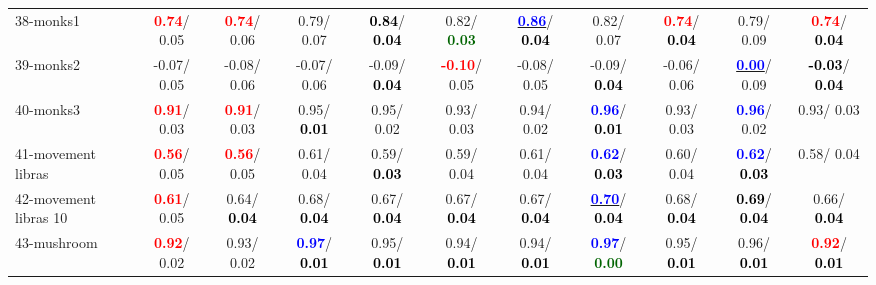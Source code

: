 \begin{table}[h]
\begin{center}
{\begin{tabular}{lc|c|c|c|c|c|c|c|c|c}
38-monks1 & \textcolor{red}{\textbf{  0.74}}/  0.05 & \textcolor{red}{\textbf{  0.74}}/  0.06 &   0.79/  0.07 & \textcolor{black}{\textbf{  0.84}}/\textcolor{black}{\textbf{  0.04}} &   0.82/\textcolor{darkgreen}{\textbf{  0.03}} & \underline{\textcolor{blue}{\textbf{  0.86}}}/\textcolor{black}{\textbf{  0.04}} &   0.82/  0.07 & \textcolor{red}{\textbf{  0.74}}/\textcolor{black}{\textbf{  0.04}} &   0.79/  0.09 & \textcolor{red}{\textbf{  0.74}}/\textcolor{black}{\textbf{  0.04}} \\
39-monks2 &  -0.07/  0.05 &  -0.08/  0.06 &  -0.07/  0.06 &  -0.09/\textcolor{black}{\textbf{  0.04}} & \textcolor{red}{\textbf{ -0.10}}/  0.05 &  -0.08/  0.05 &  -0.09/\textcolor{black}{\textbf{  0.04}} &  -0.06/  0.06 & \underline{\textcolor{blue}{\textbf{  0.00}}}/  0.09 & \textcolor{black}{\textbf{ -0.03}}/\textcolor{black}{\textbf{  0.04}} \\ \hline
40-monks3 & \textcolor{red}{\textbf{  0.91}}/  0.03 & \textcolor{red}{\textbf{  0.91}}/  0.03 &   0.95/\textcolor{black}{\textbf{  0.01}} &   0.95/  0.02 &   0.93/  0.03 &   0.94/  0.02 & \textcolor{blue}{\textbf{  0.96}}/\textcolor{black}{\textbf{  0.01}} &   0.93/  0.03 & \textcolor{blue}{\textbf{  0.96}}/  0.02 &   0.93/  0.03 \\
41-movement libras & \textcolor{red}{\textbf{  0.56}}/  0.05 & \textcolor{red}{\textbf{  0.56}}/  0.05 &   0.61/  0.04 &   0.59/\textcolor{black}{\textbf{  0.03}} &   0.59/  0.04 &   0.61/  0.04 & \textcolor{blue}{\textbf{  0.62}}/\textcolor{black}{\textbf{  0.03}} &   0.60/  0.04 & \textcolor{blue}{\textbf{  0.62}}/\textcolor{black}{\textbf{  0.03}} &   0.58/  0.04 \\
42-movement libras 10 & \textcolor{red}{\textbf{  0.61}}/  0.05 &   0.64/\textcolor{black}{\textbf{  0.04}} &   0.68/\textcolor{black}{\textbf{  0.04}} &   0.67/\textcolor{black}{\textbf{  0.04}} &   0.67/\textcolor{black}{\textbf{  0.04}} &   0.67/\textcolor{black}{\textbf{  0.04}} & \underline{\textcolor{blue}{\textbf{  0.70}}}/\textcolor{black}{\textbf{  0.04}} &   0.68/\textcolor{black}{\textbf{  0.04}} & \textcolor{black}{\textbf{  0.69}}/\textcolor{black}{\textbf{  0.04}} &   0.66/\textcolor{black}{\textbf{  0.04}} \\
43-mushroom & \textcolor{red}{\textbf{  0.92}}/  0.02 &   0.93/  0.02 & \textcolor{blue}{\textbf{  0.97}}/\textcolor{black}{\textbf{  0.01}} &   0.95/\textcolor{black}{\textbf{  0.01}} &   0.94/\textcolor{black}{\textbf{  0.01}} &   0.94/\textcolor{black}{\textbf{  0.01}} & \textcolor{blue}{\textbf{  0.97}}/\textcolor{darkgreen}{\textbf{  0.00}} &   0.95/\textcolor{black}{\textbf{  0.01}} &   0.96/\textcolor{black}{\textbf{  0.01}} & \textcolor{red}{\textbf{  0.92}}/\textcolor{black}{\textbf{  0.01}} \\

\end{tabular}}
\end{center}
\end{table}
